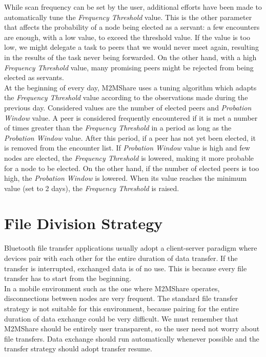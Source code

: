 While scan frequency can be set by the user, additional efforts have been made to automatically tune the \textit{Frequency Threshold} value. This is the other parameter that affects the probability of a node being elected as a servant: a few encounters are enough, with a low value, to exceed the threshold value. If the value is too low, we might delegate a task to peers that we would never meet again, resulting in the results of the task never being forwarded. On the other hand, with a high \textit{Frequency Threshold} value, many promising peers might be rejected from being elected as servants.
\\

At the beginning of every day, M2MShare uses a tuning algorithm which adapts the \textit{Frequency Threshold} value according to the observations made during the previous day. Considered values are the number of elected peers and \textit{Probation Window} value. A peer is considered frequently encountered if it is met a number of times greater than the \textit{Frequency Threshold} in a period as long as the \textit{Probation Window} value. After this period, if a peer has not yet been elected, it is removed from the encounter list. If \textit{Probation Window} value is high and few nodes are elected, the  \textit{Frequency Threshold} is lowered, making it more probable for a node to be elected. On the other hand, if the number of elected peers is too high, the \textit{Probation Window} is lowered. When its value reaches the minimum value (set to 2 days), the \textit{Frequency Threshold} is raised.


\section{File Division Strategy}
\label{descrFileDivisionStrategy}
Bluetooth file transfer applications usually adopt a client-server paradigm where devices pair with each other for the entire duration of data transfer. If the transfer is interrupted, exchanged data is of no use. This is because every file transfer has to start from the beginning. 
\\

In a mobile environment such as the one where M2MShare operates, disconnections between nodes are very frequent. The standard file transfer strategy is not suitable for this environment, because pairing for the entire duration of data exchange could be very difficult. We must remember that M2MShare should be entirely user transparent, so the user need not worry about file transfers. Data exchange should run automatically whenever possible and the transfer strategy should adopt transfer resume.
\\


